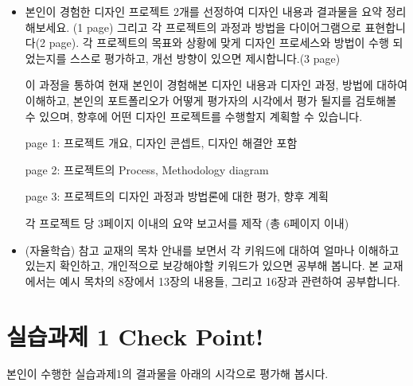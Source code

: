 \documentclass[
  letterpaper,
]{book}
\begin{document}
\begin{itemize}
\item
  본인이 경험한 디자인 프로젝트 2개를 선정하여 디자인 내용과 결과물을
  요약 정리해보세요. (1 page) 그리고 각 프로젝트의 과정과 방법을
  다이어그램으로 표현합니다(2 page). 각 프로젝트의 목표와 상황에 맞게
  디자인 프로세스와 방법이 수행 되었는지를 스스로 평가하고, 개선 방향이
  있으면 제시합니다.(3 page)

  이 과정을 통하여 현재 본인이 경험해본 디자인 내용과 디자인 과정,
  방법에 대하여 이해하고, 본인의 포트폴리오가 어떻게 평가자의 시각에서
  평가 될지를 검토해볼 수 있으며, 향후에 어떤 디자인 프로젝트를 수행할지
  계획할 수 있습니다.

  page 1: 프로젝트 개요, 디자인 콘셉트, 디자인 해결안 포함

  page 2: 프로젝트의 Process, Methodology diagram

  page 3: 프로젝트의 디자인 과정과 방법론에 대한 평가, 향후 계획

  각 프로젝트 당 3페이지 이내의 요약 보고서를 제작 (총 6페이지 이내)
\item
  (자율학습) 참고 교재의 목차 안내를 보면서 각 키워드에 대하여 얼마나
  이해하고 있는지 확인하고, 개인적으로 보강해야할 키워드가 있으면 공부해
  봅니다. 본 교재에서는 예시 목차의 8장에서 13장의 내용들, 그리고 16장과
  관련하여 공부합니다.
\end{itemize}

\section{실습과제 1 Check
Point!}\label{uxc2e4uxc2b5uxacfcuxc81c-1-check-point}

본인이 수행한 실습과제1의 결과물을 아래의 시각으로 평가해 봅시다.
\end{document}

